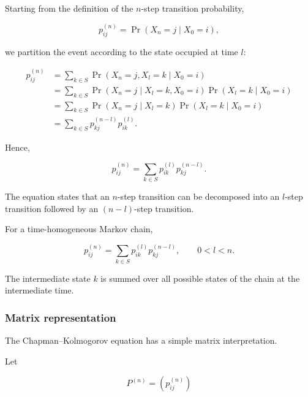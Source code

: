 \documentclass[
  letterpaper,
  DIV=11,
  numbers=noendperiod]{scrartcl}
\theoremstyle{definition}
\theoremstyle{remark}
\begin{document}
Starting from the definition of the \(n\)-step transition probability,

\[
p_{ij}^{(n)}
=
\Pr(X_n=j\mid X_0=i),
\]

we partition the event according to the state occupied at time \(l\):

\[
\begin{aligned}
p_{ij}^{(n)}
&=
\sum_{k\in S}
\Pr(X_n=j,X_l=k\mid X_0=i)\\
&=
\sum_{k\in S}
\Pr(X_n=j\mid X_l=k,X_0=i)
\Pr(X_l=k\mid X_0=i)\\
&=
\sum_{k\in S}
\Pr(X_n=j\mid X_l=k)
\Pr(X_l=k\mid X_0=i)\\
&=
\sum_{k\in S}
p_{kj}^{(n-l)}p_{ik}^{(l)}.
\end{aligned}
\]

Hence,

\[
\boxed{
p_{ij}^{(n)}
=
\sum_{k\in S}
p_{ik}^{(l)}p_{kj}^{(n-l)}.
}
\]

The equation states that an \(n\)-step transition can be decomposed into
an \(l\)-step transition followed by an \((n-l)\)-step transition.

\begin{tcolorbox}[enhanced jigsaw, arc=.35mm, bottomrule=.15mm, bottomtitle=1mm, breakable, colback=white, colbacktitle=quarto-callout-note-color!10!white, colframe=quarto-callout-note-color-frame, coltitle=black, left=2mm, leftrule=.75mm, opacityback=0, opacitybacktitle=0.6, rightrule=.15mm, title=\textcolor{quarto-callout-note-color}{\faInfo}\hspace{0.5em}{Chapman--Kolmogorov equation}, titlerule=0mm, toprule=.15mm, toptitle=1mm]

For a time-homogeneous Markov chain,

\[
\boxed{
p_{ij}^{(n)}
=
\sum_{k\in S}
p_{ik}^{(l)}p_{kj}^{(n-l)},
\qquad 0<l<n.
}
\]

The intermediate state \(k\) is summed over all possible states of the
chain at the intermediate time.

\end{tcolorbox}

\subsubsection{Matrix representation}\label{matrix-representation}

The Chapman--Kolmogorov equation has a simple matrix interpretation.

Let

\[
P^{(n)}=(p_{ij}^{(n)})
\]
\end{document}
